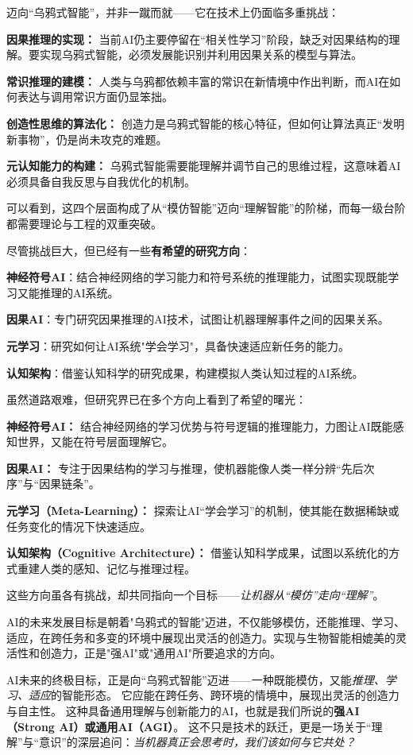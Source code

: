 迈向“乌鸦式智能”，并非一蹴而就——它在技术上仍面临多重挑战：

\textbf{因果推理的实现：} 当前AI仍主要停留在“相关性学习”阶段，缺乏对因果结构的理解。要实现乌鸦式智能，必须发展能识别并利用因果关系的模型与算法。

\textbf{常识推理的建模：} 人类与乌鸦都依赖丰富的常识在新情境中作出判断，而AI在如何表达与调用常识方面仍显笨拙。

\textbf{创造性思维的算法化：} 创造力是乌鸦式智能的核心特征，但如何让算法真正“发明新事物”，仍是尚未攻克的难题。

\textbf{元认知能力的构建：} 乌鸦式智能需要能理解并调节自己的思维过程，这意味着AI必须具备自我反思与自我优化的机制。

可以看到，这四个层面构成了从“模仿智能”迈向“理解智能”的阶梯，而每一级台阶都需要理论与工程的双重突破。

尽管挑战巨大，但已经有一些\textbf{有希望的研究方向}：

\textbf{神经符号AI}：结合神经网络的学习能力和符号系统的推理能力，试图实现既能学习又能推理的AI系统。

\textbf{因果AI}：专门研究因果推理的AI技术，试图让机器理解事件之间的因果关系。

\textbf{元学习}：研究如何让AI系统"学会学习"，具备快速适应新任务的能力。

\textbf{认知架构}：借鉴认知科学的研究成果，构建模拟人类认知过程的AI系统。

虽然道路艰难，但研究界已在多个方向上看到了希望的曙光：

\textbf{神经符号AI：} 结合神经网络的学习优势与符号逻辑的推理能力，力图让AI既能感知世界，又能在符号层面理解它。

\textbf{因果AI：} 专注于因果结构的学习与推理，使机器能像人类一样分辨“先后次序”与“因果链条”。

\textbf{元学习（Meta-Learning）：} 探索让AI“学会学习”的机制，使其能在数据稀缺或任务变化的情况下快速适应。

\textbf{认知架构（Cognitive Architecture）：} 借鉴认知科学成果，试图以系统化的方式重建人类的感知、记忆与推理过程。

这些方向虽各有挑战，却共同指向一个目标——\emph{让机器从“模仿”走向“理解”}。

AI的未来发展目标是朝着"乌鸦式的智能"迈进，不仅能够模仿，还能推理、学习、适应，在跨任务和多变的环境中展现出灵活的创造力。实现与生物智能相媲美的灵活性和创造力，正是"强AI"或"通用AI"所要追求的方向。

AI未来的终极目标，正是向“乌鸦式智能”迈进——一种既能模仿，又能\emph{推理、学习、适应}的智能形态。
它应能在跨任务、跨环境的情境中，展现出灵活的创造力与自主性。
这种具备通用理解与创新能力的AI，也就是我们所说的\textbf{强AI（Strong AI）或通用AI（AGI）}。
这不只是技术的跃迁，更是一场关于“理解”与“意识”的深层追问：\emph{当机器真正会思考时，我们该如何与它共处？}

